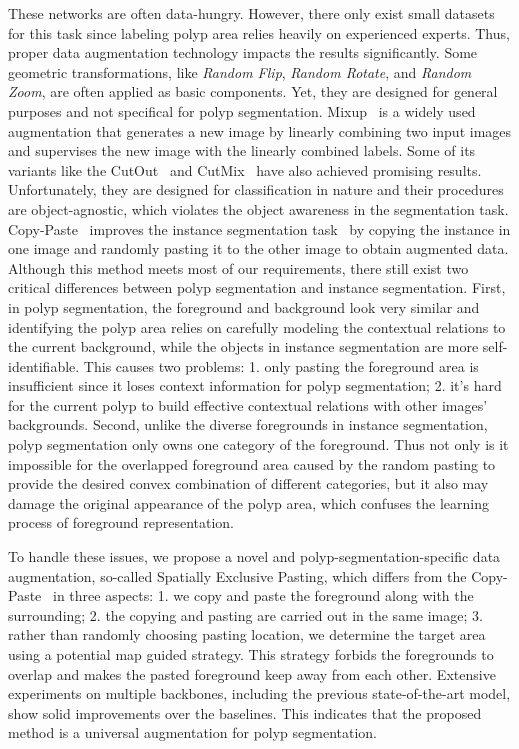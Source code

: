 \documentclass{article}
\begin{document}
These networks are often data-hungry. However, there only exist small datasets for this task since labeling polyp area relies heavily on experienced experts. Thus, proper data augmentation technology impacts the results significantly. Some geometric transformations, like \emph{Random Flip}, \emph{Random Rotate}, and \emph{Random Zoom}, are often applied as basic components. Yet, they are designed for general purposes and not specifical for polyp segmentation. Mixup~\cite{mixup} is a widely used augmentation that generates a new image by linearly combining two input images and supervises the new image with the linearly combined labels. Some of its variants like the CutOut~\cite{cutout} and CutMix~\cite{cutmix} have also achieved promising results. Unfortunately, they are designed for classification in nature and their procedures are object-agnostic, which violates the object awareness in the segmentation task. Copy-Paste~\cite{copypaste} improves the instance segmentation task~\cite{maskrcnn} by copying the instance in one image and randomly pasting it to the other image to obtain augmented data. Although this method meets most of our requirements, there still exist two critical differences between polyp segmentation and instance segmentation. First, in polyp segmentation, the foreground and background look very similar and identifying the polyp area relies on carefully modeling the contextual relations to the current background, while the objects in instance segmentation are more self-identifiable. This causes two problems: 1. only pasting the foreground area is insufficient since it loses context information for polyp segmentation; 2. it's hard for the current polyp to build effective contextual relations with other images' backgrounds. Second, unlike the diverse foregrounds in instance segmentation, polyp segmentation only owns one category of the foreground. Thus not only is it impossible for the overlapped foreground area caused by the random pasting to provide the desired convex combination of different categories, but it also may damage the original appearance of the polyp area, which confuses the learning process of foreground representation.






To handle these issues, we propose a novel and polyp-segmentation-specific data augmentation, so-called Spatially Exclusive Pasting, which differs from the Copy-Paste~\cite{copypaste} in three aspects: 1. we copy and paste 
the foreground along with the surrounding; 2. the copying and pasting are carried out in the same image; 3. rather than randomly choosing pasting location, we determine the target area using a potential map guided strategy. This strategy forbids the foregrounds to overlap and makes the pasted foreground keep away from each other. Extensive experiments on multiple backbones, including the previous state-of-the-art model, show solid improvements over the baselines. This indicates that the proposed method is a universal augmentation for polyp segmentation.
\end{document}
